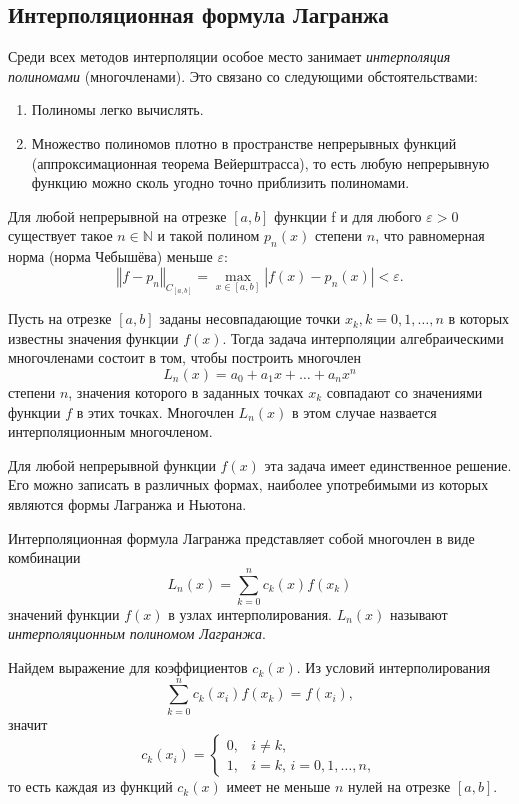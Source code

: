\subsection{Интерполяционная формула Лагранжа}

Среди всех методов интерполяции особое место занимает \emph{интерполяция
полиномами} (многочленами). Это связано со следующими обстоятельствами:
\begin{enumerate}
\item Полиномы легко вычислять.
\item Множество полиномов плотно в пространстве непрерывных функций (аппроксимационная
теорема Вейерштрасса), то есть любую непрерывную функцию можно сколь
угодно точно приблизить полиномами.\end{enumerate}
\begin{thm}
\emph{} Для любой непрерывной на отрезке $[a,b]$ функции f и для
любого $\varepsilon>0$ существует такое $n\in\mathbb{N}$ и такой
полином $p_{n}(x)$ степени $n$, что равномерная норма (норма Чебышёва)
меньше $\varepsilon$:
\[
\left\Vert f-p_{n}\right\Vert _{C_{[a,b]}}=\max_{x\in[a,b]}|f(x)-p_{n}(x)|<\varepsilon.
\]

\end{thm}
Пусть на отрезке $[a,b]$ заданы несовпадающие точки $x_{k},k=0,1,\dots,n$
в которых известны значения функции $f(x)$. Тогда задача интерполяции
алгебраическими многочленами состоит в том, чтобы построить многочлен
\[
L_{n}(x)=a_{0}+a_{1}x+\dots+a_{n}x^{n}
\]
степени $n$, значения которого в заданных точках $x_{k}$ совпадают
со значениями функции $f$ в этих точках. Многочлен $L_{n}(x)$ в
этом случае назвается интерполяционным многочленом.

Для любой непрерывной функции $f(x)$ эта задача имеет единственное
решение. Его можно записать в различных формах, наиболее употребимыми
из которых являются формы Лагранжа и Ньютона.

Интерполяционная формула Лагранжа представляет собой многочлен в виде
комбинации
\[
L_{n}(x)=\sum_{k=0}^{n}c_{k}(x)f(x_{k})
\]
значений функции $f(x)$ в узлах интерполирования. $L_{n}(x)$ называют
\emph{интерполяционным полиномом Лагранжа}.

Найдем выражение для коэффициентов $c_{k}(x)$. Из условий интерполирования
\[
\sum_{k=0}^{n}c_{k}(x_{i})f(x_{k})=f(x_{i}),
\]
значит
\[
c_{k}(x_{i})=\begin{cases}
0, & i\neq k,\\
1, & i=k,\, i=0,1,\dots,n,
\end{cases}
\]
то есть каждая из функций $c_{k}(x)$ имеет не меньше $n$ нулей на
отрезке $[a,b]$.

